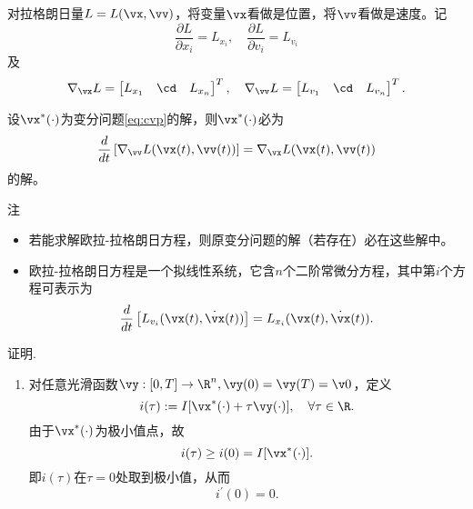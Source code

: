 \begin{frame}{\subsecname}
    对拉格朗日量$L=L(\vx,\vv)$，将变量$\vx$看做是位置，将$\vv$看做是速度。记
    $$
    \frac{\partial L}{\partial x_i} = L_{x_i}, \quad
    \frac{\partial L}{\partial v_i} = L_{v_i}
    $$
    及
    $$
    \nabla_{\vx} L = 
    \begin{bmatrix}
    L_{x_1} & \cd & L_{x_n}
    \end{bmatrix}^T, \quad 
    \nabla_{\vv} L = 
    \begin{bmatrix}
    L_{v_1} & \cd & L_{v_n}
    \end{bmatrix}^T. 
    $$
    
    \pause 
    \begin{theorem}[欧拉-拉格朗日方程]
    设$\vx^*(\cdot)$为变分问题\eqref{eq:cvp}的解，则$\vx^*(\cdot)$必为
    \begin{equation}\label{eq:EL}
        \frac{d}{dt} \left[\nabla_{\vv} L(\vx(t),\vv(t))\right] = \nabla_{\vx} L(\vx(t),\vv(t))
    \end{equation}
    的解。
    \end{theorem}
    \pause 
    \begin{block}{注}
    \begin{itemize}
    \item 若能求解欧拉-拉格朗日方程，则原变分问题的解（若存在）必在这些解中。
   \item 欧拉-拉格朗日方程是一个拟线性系统，它含$n$个二阶常微分方程，其中第$i$个方程可表示为
   \begin{equation}
       \frac{d}{dt} \left[L_{v_i}(\vx(t), \dot\vx(t))\right] = L_{x_i}(\vx(t), \dot\vx(t)).
   \end{equation}
    \end{itemize}

    \end{block} 
\end{frame}

\begin{frame}{\subsecname}
    \begin{block}{证明.}
    \begin{enumerate}
        \item 对任意光滑函数$\vy: [0,T]\to \R^n, \vy(0)=\vy(T)=\v0$，定义
        $$
        i(\tau) := I[\vx^*(\cdot) + \tau\vy(\cdot)], \quad \forall \tau \in \R.
        $$
        由于$\vx^*(\cdot)$为极小值点，故
        $$
        i(\tau) \ge i(0) = I[\vx^*(\cdot)] .
        $$
        即$i(\tau)$在$\tau=0$处取到极小值，从而
        $$
        i^\prime(0) = 0.
        $$
    \end{enumerate}
    \end{block}
\end{frame}

